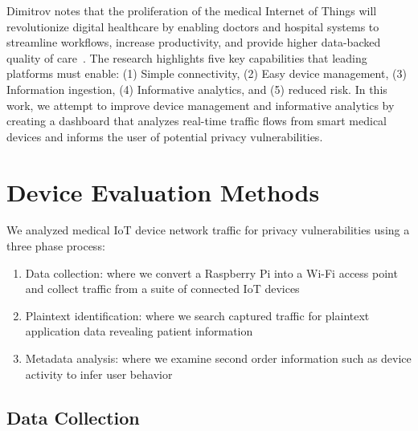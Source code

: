 
Dimitrov notes that
the proliferation of the medical Internet of Things will revolutionize digital healthcare
by enabling doctors and hospital systems to streamline workflows, increase productivity,
and provide higher data-backed quality of care~\cite{dimitrovIoT}. The research
highlights five key capabilities that leading platforms must enable: (1) Simple
connectivity, (2) Easy device management, (3) Information ingestion, (4) Informative analytics, and (5) reduced risk. In this work, we attempt to improve device management and informative analytics by creating a dashboard that analyzes real-time traffic flows from smart medical devices and informs the user of potential privacy vulnerabilities.

\section{Device Evaluation Methods}

We analyzed medical IoT device network traffic for privacy vulnerabilities using a three phase process:

\begin{enumerate}
  \item Data collection: where we convert a Raspberry Pi into a Wi-Fi access point and collect traffic from a suite of connected IoT devices
  \item Plaintext identification: where we search captured traffic for plaintext application data revealing patient information
  \item Metadata analysis: where we examine second order information such as device activity to infer user behavior
\end{enumerate}

\subsection{Data Collection}

